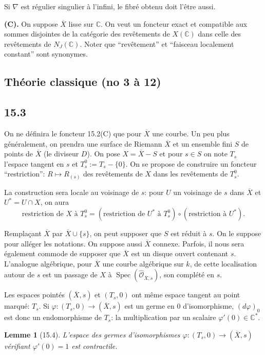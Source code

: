 \documentclass[12pt,a4paper]{article}
\theoremstyle{plain}
\newtheorem{lemma}[theorem]{Lemme}
\theoremstyle{definition}
\theoremstyle{remark}
\DeclareMathOperator{\Spec}{Spec}
\newcommand{\cO}{\mathcal{O}}
\newcommand{\bC}{\mathbb{C}}
\begin{document}
Si $\nabla$ est régulier singulier à l'infini, le fibré obtenu doit l'être aussi.

\textbf{(C).} On suppose $\overline{X}$ lisse sur $\bC$. On veut un foncteur exact et compatible aux sommes disjointes de la catégorie des revêtements de $X(\bC)$ dans celle des revêtements de $N_J(\bC)$. Noter que ``revêtement'' et ``faisceau localement constant'' sont synonymes.

\subsection*{Théorie classique (no 3 à 12)}

\subsection*{15.3}

On ne définira le foncteur 15.2(C) que pour $\overline{X}$ une courbe. Un peu plus généralement, on prendra une surface de Riemann $\overline{X}$ et un ensemble fini $S$ de points de $\overline{X}$ (le diviseur $D$). On pose $X = \overline{X} - S$ et pour $s \in S$ on note $T_s$ l'espace tangent en $s$ et $T_s^0 := T_s - \{0\}$. On se propose de construire un foncteur ``restriction'': $R \mapsto R_{(s)}$ des revêtements de $X$ dans les revêtements de $T_s^0$.

La construction sera locale au voisinage de $s$: pour $U$ un voisinage de $s$ dans $\overline{X}$ et $U^* = U \cap X$, on aura
\[
\text{restriction de } X \text{ à } T_s^0 = (\text{restriction de } U^* \text{ à } T_s^0) \circ (\text{restriction à } U^*).
\]

Remplaçant $\overline{X}$ par $\overline{X} \cup \{s\}$, on peut supposer que $S$ est réduit à $s$. On le suppose pour alléger les notations. On suppose aussi $\overline{X}$ connexe. Parfois, il nous sera également commode de supposer que $\overline{X}$ est un disque ouvert contenant $s$. L'analogue algébrique, pour $\overline{X}$ une courbe algébrique sur $k$, de cette localisation autour de $s$ est un passage de $X$ à $\Spec(\hat{\cO}_{\overline{X}, s})$, son complété en $s$.

Les espaces pointés $(\overline{X}, s)$ et $(T_s, 0)$ ont même espace tangent au point marqué: $T_s$. Si $\varphi : (T_s, 0) \to (\overline{X}, s)$ est un germe en $0$ d'isomorphisme, $(d\varphi)_0$ est donc un endomorphisme de $T_s$: la multiplication par un scalaire $\varphi'(0) \in \bC^*$.

\begin{lemma}[15.4]
L'espace des germes d'isomorphismes $\varphi : (T_s, 0) \to (\overline{X}, s)$ vérifiant $\varphi'(0) = 1$ est contractile.
\end{lemma}
\end{document}
